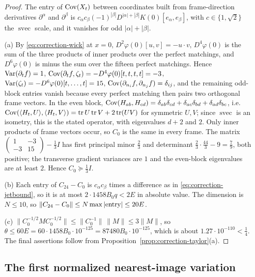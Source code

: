 \begin{proof}
The entry of $\operatorname{Cov}(X_t)$ between coordinates built from frame-direction derivatives $\partial^\alpha$ and $\partial^\beta$ is $c_\alpha c_\beta(-1)^{|\beta|}D^{|\alpha|+|\beta|}K(0)[e_\alpha,e_\beta]$, with $c\in\{1,\sqrt2\}$ the $\operatorname{svec}$ scale, and it vanishes for odd $|\alpha|+|\beta|$.

(a) By \eqref{eq:correction-wick} at $x=0$, $D^2\varphi(0)[u,v]=-u\cdot v$, $D^4\varphi(0)$ is the sum of the three products of inner products over the perfect matchings, and $D^6\varphi(0)$ is minus the sum over the fifteen perfect matchings. Hence $\operatorname{Var}(\partial_tf)=1$, $\operatorname{Cov}(\partial_tf,\zeta_t)=-D^4\varphi(0)[t,t,t,t]=-3$, $\operatorname{Var}(\zeta_t)=-D^6\varphi(0)[t,\dots,t]=15$, $\operatorname{Cov}(\partial_{n_i}f,\partial_{n_j}f)=\delta_{ij}$, and the remaining odd-block entries vanish because every perfect matching then pairs two orthogonal frame vectors. In the even block, $\operatorname{Cov}(H_{ab},H_{cd})=\delta_{ab}\delta_{cd}+\delta_{ac}\delta_{bd}+\delta_{ad}\delta_{bc}$, i.e.\ $\operatorname{Cov}(\langle H_t,U\rangle,\langle H_t,V\rangle)=\operatorname{tr} U\operatorname{tr} V+2\operatorname{tr}(UV)$ for symmetric $U,V$; since $\operatorname{svec}$ is an isometry, this is the stated operator, with eigenvalues $d+2$ and $2$. Only inner products of frame vectors occur, so $C_0$ is the same in every frame. The matrix $\left(\begin{smallmatrix}1&-3\\-3&15\end{smallmatrix}\right)-\frac13I$ has first principal minor $\frac23$ and determinant $\frac23\cdot\frac{44}3-9=\frac79$, both positive; the transverse gradient variances are $1$ and the even-block eigenvalues are at least $2$. Hence $C_0\succcurlyeq\frac13I$.

(b) Each entry of $C_{24}-C_0$ is $c_\alpha c_\beta$ times a difference as in \eqref{eq:correction-jetbound}, so it is at most $2\cdot1458B_0q<2E$ in absolute value. The dimension is $N\le10$, so $\|C_{24}-C_0\|\le N\max|{\rm entry}|\le20E$.

(c) $\|C_0^{-1/2}MC_0^{-1/2}\|\le\|C_0^{-1}\|\,\|M\|\le3\|M\|$, so $\theta\le60E=60\cdot1458B_0\cdot10^{-125}=87480B_0\cdot10^{-125}$, which is about $1.27\cdot10^{-110}<\frac14$. The final assertions follow from Proposition~\ref{prop:correction-taylor}(a).
\end{proof}

\subsection{The first normalized nearest-image variation}

